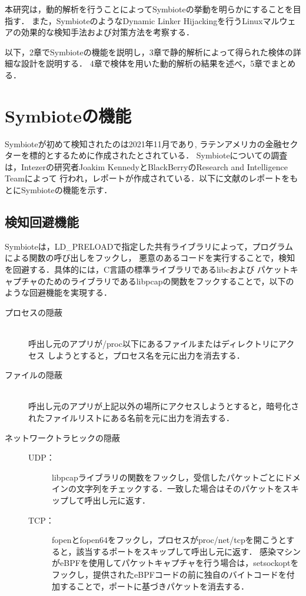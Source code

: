 \documentclass[submit,techreq,noauthor]{eco}	%
\begin{document}
本研究は，動的解析を行うことによってSymbioteの挙動を明らかにすることを目指す．
また，SymbioteのようなDynamic Linker Hijackingを行うLinuxマルウェアの効果的な検知手法および対策方法を考察する．


以下，2章でSymbioteの機能を説明し，3章で静的解析によって得られた検体の詳細な設計を説明する．
4章で検体を用いた動的解析の結果を述べ，5章でまとめる．\\


\section{Symbioteの機能}
Symbioteが初めて検知されたのは2021年11月であり,
ラテンアメリカの金融セクターを標的とするために作成されたとされている．
Symbioteについての調査は，Intezerの研究者Joakim KennedyとBlackBerryのResearch and Intelligence Teamによって
行われ，レポートが作成されている．以下に文献\cite{Symbiote}のレポートをもとにSymbioteの機能を示す．


\subsection{検知回避機能}
Symbioteは，LD\_PRELOADで指定した共有ライブラリによって，プログラムによる関数の呼び出しをフックし，
悪意のあるコードを実行することで，検知を回避する．具体的には，C言語の標準ライブラリであるlibcおよび
パケットキャプチャのためのライブラリであるlibpcapの関数をフックすることで，以下のような回避機能を実現する．
  \begin{description}
    \item [プロセスの隠蔽] \mbox{}\\
    呼出し元のアプリが/proc以下にあるファイルまたはディレクトリにアクセス
    しようとすると，プロセス名を元に出力を消去する．
    \item [ファイルの隠蔽] \mbox{}\\
    呼出し元のアプリが上記以外の場所にアクセスしようとすると，暗号化さ
    れたファイルリストにある名前を元に出力を消去する．
    \item [ネットワークトラヒックの隠蔽] \mbox{}
      \begin{description}
        \item[UDP：] 
        libpcapライブラリの関数をフックし，受信したパケットごとにドメインの文字列をチェックする．一致した場合はそのパケットをスキップして呼出し元に返す．
        \item[TCP：] 
        fopenとfopen64をフックし，プロセスがproc/net/tcpを開こうとすると，該当するポートをスキップして呼出し元に返す．
        感染マシンがeBPFを使用してパケットキャプチャを行う場合は，setsockoptをフックし，提供されたeBPFコードの前に独自のバイトコードを付加することで，ポートに基づきパケットを消去する．
      \end{description}
  \end{description}
\end{document}
